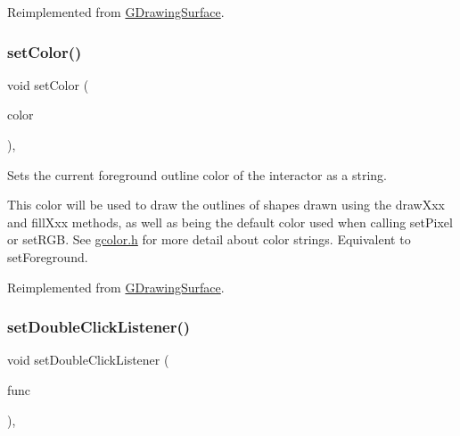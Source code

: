Reimplemented from \mbox{\hyperlink{classGDrawingSurface_a75b9cb32ff80bf061791beb01a8433d0}{G\+Drawing\+Surface}}.

\mbox{\label{classGCanvas_a56845b1accc47aa881d05939eef6996c}} 
\subsubsection{\texorpdfstring{set\+Color()}{setColor()}\hspace{0.1cm}{\footnotesize\ttfamily [2/2]}}
{\footnotesize\ttfamily void set\+Color (\begin{DoxyParamCaption}\item[{const std\+::string \&}]{color }\end{DoxyParamCaption})\hspace{0.3cm}{\ttfamily [override]}, {\ttfamily [virtual]}}



Sets the current foreground outline color of the interactor as a string. 

This color will be used to draw the outlines of shapes drawn using the draw\+Xxx and fill\+Xxx methods, as well as being the default color used when calling set\+Pixel or set\+R\+GB. See \mbox{\hyperlink{gcolor_8h_source}{gcolor.\+h}} for more detail about color strings. Equivalent to set\+Foreground. 

Reimplemented from \mbox{\hyperlink{classGDrawingSurface_a61374df6c11b52cfbb0815decdbaebc6}{G\+Drawing\+Surface}}.

\mbox{\label{classGInteractor_ac29f9a3462458e165fae3a1f046ee77a}} 
\subsubsection{\texorpdfstring{set\+Double\+Click\+Listener()}{setDoubleClickListener()}\hspace{0.1cm}{\footnotesize\ttfamily [1/2]}}
{\footnotesize\ttfamily void set\+Double\+Click\+Listener (\begin{DoxyParamCaption}\item[{G\+Event\+Listener}]{func }\end{DoxyParamCaption})\hspace{0.3cm}{\ttfamily [virtual]}, {\ttfamily [inherited]}}



